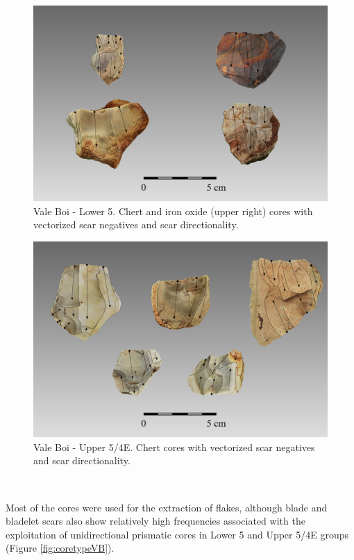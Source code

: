 \documentclass[12pt,twoside]{reedthesis}
\begin{document}
~
\begin{figure}[H]

{\centering \includegraphics[width=0.8\linewidth]{figure/coreL} 

}

\caption{Vale Boi - Lower 5. Chert and iron oxide (upper right) cores with vectorized scar negatives and scar directionality.}\label{fig:corelower}
\end{figure}
\begin{figure}[H]

{\centering \includegraphics[width=0.8\linewidth]{figure/coreU} 

}

\caption{Vale Boi - Upper 5/4E. Chert cores with vectorized scar negatives and scar directionality.}\label{fig:coreupper}
\end{figure}
~

Most of the cores were used for the extraction of flakes, although blade and bladelet scars also show relatively high frequencies associated with the exploitation of unidirectional prismatic cores in Lower 5 and Upper 5/4E groups (Figure \ref{fig:coretypeVB}).
\end{document}
